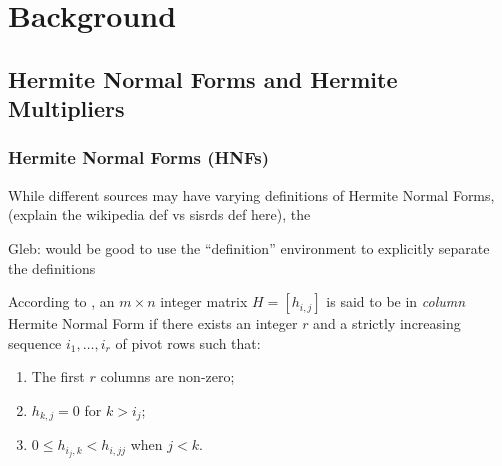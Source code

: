 \documentclass[oneside, a4paper, onecolumn, 11pt]{article}
\begin{document}

\section{Background}

\subsection{Hermite Normal Forms and Hermite Multipliers}

\subsubsection{Hermite Normal Forms (HNFs)}

While different sources may have varying definitions of Hermite Normal Forms, (explain the wikipedia def vs sisrds def here), the

{\color{purple}Gleb: would be good to use the ``definition'' environment to explicitly separate the definitions}

According to \cite[SISRDS]{Hubert2013}, an \(m \times n\) integer matrix \(H = [h_{i, j}]\) is said to be in \textit{column} Hermite Normal Form if there exists an integer \(r\) and a strictly increasing sequence \(i_1, \dots, i_r\) of pivot rows such that:
\begin{enumerate}[label=(\roman*)]
    \item The first \(r\) columns are non-zero;
    \item \(h_{k, j} = 0\) for \(k > i_j\);
    \item \(0 \le h_{i_j, k} < h_{i,j j}\) when \(j < k\).
\end{enumerate}
\end{document}

